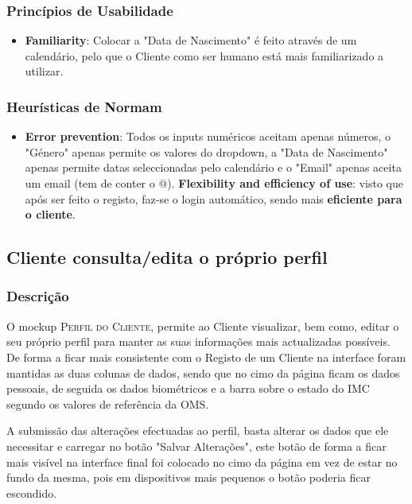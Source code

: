 \subsubsection{Princípios de Usabilidade}
\begin{itemize}
    \item \textbf{Familiarity}: Colocar a "Data de Nascimento" é feito através de um calendário, pelo que o Cliente como ser humano está mais familiarizado a utilizar.
    
\end{itemize}

\subsubsection{Heurísticas de Normam}
\begin{itemize}
    \item \textbf{Error prevention}: Todos os inputs numéricos aceitam apenas números, o "Género" apenas permite os valores do dropdown, a "Data de Nascimento" apenas permite datas seleccionadas pelo calendário e o "Email" apenas aceita um email (tem de conter o @).
    \textbf{Flexibility and efficiency of use}: visto que após ser feito o registo, faz-se o login automático, sendo mais \textbf{eficiente para o cliente}.
    
\end{itemize}

\subsection{Cliente consulta/edita o próprio perfil}
\label{subsec:perfilclientebycliente}

\subsubsection{Descrição}
\hspace{5mm} O mockup \textsc{Perfil do Cliente}, permite ao Cliente visualizar, bem como, editar o seu próprio perfil para manter as suas informações mais actualizadas possíveis. De forma a ficar mais consistente com o Registo de um Cliente na interface foram mantidas as duas colunas de dados, sendo que no cimo da página ficam os dados pessoais, de seguida os dados biométricos e a barra sobre o estado do IMC segundo os valores de referência da OMS.

\hspace{5mm} A submissão das alterações efectuadas ao perfil, basta alterar os dados que ele necessitar e carregar no botão "Salvar Alterações", este botão de forma a ficar mais visível na interface final foi colocado no cimo da página em vez de estar no fundo da mesma, pois em dispositivos mais pequenos o botão poderia ficar escondido.


